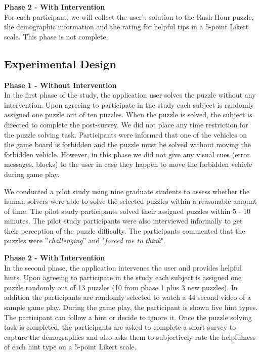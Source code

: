 \textbf{Phase 2 - With Intervention}\\
For each participant, we will collect the user's solution to the Rush Hour puzzle, the demographic information and the rating for helpful tips in a 5-point Likert scale. This phase is not complete.

\subsection*{Experimental Design}
\textbf{Phase 1 - Without Intervention}\\
In the first phase of the study, the application user solves the puzzle without any intervention. Upon agreeing to participate in the study each subject is randomly assigned one puzzle out of ten puzzles. When the puzzle is solved, the subject is directed to complete the post-survey. We did not place any time restriction for the puzzle solving task. Participants were informed that one of the vehicles on the game board is forbidden and the puzzle must be solved without moving the forbidden vehicle. However, in this phase we did not give any visual cues (error messages, blocks) to the user in case they happen to move the forbidden vehicle during game play. 

We conducted a pilot study using nine graduate students to assess whether the human solvers were able to solve the selected puzzles within a reasonable amount of time. The pilot study participants solved their assigned puzzles within 5 - 10 minutes. The pilot study participants were also interviewed informally to get their perception of the puzzle difficulty. The participants commented that the puzzles were ''\textit{challenging}'' and "\textit{forced me to think}".

\textbf{Phase 2 - With Intervention}\\
In the second phase, the application intervenes the user and provides helpful hints. Upon agreeing to participate in the study each subject is assigned one puzzle randomly out of 13 puzzles (10 from phase 1 plus 3 new puzzles). In addition the participants are randomly selected to watch a 44 second video of a sample game play. During the game play, the participant is shown five hint types. The participant can follow a hint or decide to ignore it. Once the puzzle solving task is completed, the participants are asked to complete a short survey to capture the demographics and also asks them to subjectively rate the helpfulness of each hint type on a 5-point Likert scale. 

